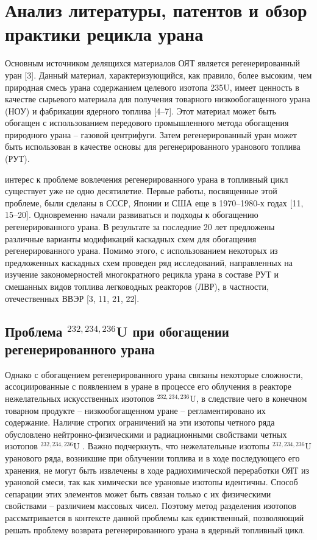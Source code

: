 \chapter{Анализ литературы, патентов и обзор практики рецикла урана}\label{ch1}

Основным источником делящихся материалов ОЯТ является регенерированный уран [3]. Данный материал, характеризующийся, как правило, более высоким, чем природная смесь урана содержанием целевого изотопа 235U, имеет ценность в качестве сырьевого материала для получения товарного низкообогащенного урана (НОУ) и фабрикации ядерного топлива [4–7]. Этот материал может быть обогащен с использованием передового промышленного метода обогащения природного урана -- газовой центрифуги. Затем регенерированный уран может быть использован в качестве основы для регенерированного уранового топлива (РУТ).

интерес к проблеме вовлечения регенерированного урана в топливный цикл существует уже не одно десятилетие. Первые работы, посвященные этой проблеме, были сделаны в СССР, Японии и США еще в 1970–1980-х годах [11, 15–20]. Одновременно начали развиваться и подходы к обогащению регенерированного урана. В результате за последние 20 лет предложены различные варианты модификаций каскадных схем для обогащения регенерированного урана. Помимо этого, с использованием некоторых из предложенных каскадных схем проведен ряд исследований, направленных на изучение закономерностей многократного рецикла урана в составе РУТ и смешанных видов топлива легководных реакторов (ЛВР), в частности, отечественных ВВЭР [3, 11, 21, 22]. 

\section{Проблема $^{232,234,236}$U при обогащении регенерированного урана}

Однако с обогащением регенерированного урана связаны некоторые сложности, ассоциированные с появлением в уране в процессе его облучения в реакторе нежелательных искусственных изотопов $^{232,234,236}$U, в следствие чего в конечном товарном продукте -- низкообогащенном уране -- регламентировано их содержание.
Наличие строгих ограничений на эти изотопы четного ряда обусловлено нейтронно-физическими и радиационными свойствами четных изотопов $^{232,234,236}$U \cite{smirnovEvolutionIsotopicComposition2012, proselkovAnalizVozmozhnostiIspolzovaniya2003, dudnikovInfluence236UEfficacy2016}.
Важно подчеркнуть, что нежелательные изотопы $^{232,234,236}$U уранового ряда, возникшие при облучении топлива и в ходе последующего его хранения, не могут быть извлечены в ходе радиохимической переработки ОЯТ из урановой смеси, так как химически все урановые изотопы идентичны. Способ сепарации этих элементов может быть связан только с их физическими свойствами -- различием массовых чисел. Поэтому метод разделения изотопов рассматривается в контексте данной проблемы как единственный, позволяющий решать проблему возврата регенерированного урана в ядерный топливный цикл. 

